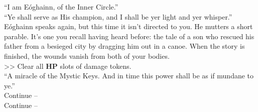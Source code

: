 “I am Eóghainn, of the Inner Circle.”\\

“Ye shall serve as His champion, and I shall be yer light and yer whisper.”\\

Eóghainn speaks again, but this time it isn’t directed to you. He mutters a short parable. It’s one you recall having heard before: the tale of a son who rescued his father from a besieged city by dragging him out in a canoe. When the story is finished, the wounds vanish from both of your bodies.\\
>> Clear all \textbf{HP} slots of damage tokens.\\

“A miracle of the Mystic Keys. And in time this power shall be as if mundane to ye.”\\

 Continue -- \\
 Continue -- 